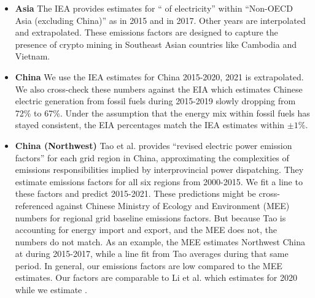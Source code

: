 \begin{appendices}
\begin{itemize}

    \item \textbf{Asia} The IEA\cite[65]{iea_co2_2019} provides estimates for ``\ef{} of electricity'' within ``Non-OECD Asia (excluding China)'' as  in 2015 and  in 2017. Other years are interpolated and extrapolated. These emissions factors are designed to capture the presence of crypto mining in Southeast Asian countries like Cambodia and Vietnam\cite{redman_chinese_2018}.
    
    \item \textbf{China} We use the IEA\cite{iea_development_2020} estimates for China 2015-2020, 2021 is extrapolated. We also cross-check these numbers against the EIA\cite{us_eia_international_2021} which estimates Chinese electric generation from fossil fuels during 2015-2019 slowly dropping from 72\% to 67\%. Under the assumption that the energy mix within fossil fuels has stayed consistent, the EIA percentages match the IEA estimates within $\pm1\%$.
    
    \item \textbf{China (Northwest)} Tao et al.\cite{tao_measuring_2016} provides ``revised electric power emission factors'' for each grid region in China, approximating the complexities of emissions responsibilities implied by interprovincial power dispatching. They estimate emissions factors for all six regions from 2000-2015. We fit a line to these factors and predict 2015-2021. These predictions might be cross-referenced against Chinese Ministry of Ecology and Environment (MEE) numbers for regional grid baseline emissions factors\cite{yu_baseline_2020}. But because Tao is accounting for energy import and export, and the MEE does not, the numbers do not match. As an example, the MEE estimates Northwest China at  during 2015-2017, while a line fit from Tao averages  during that same period. In general, our emissions factors are low compared to the MEE estimates. Our factors are comparable to Li et al.\cite{li_life_2018} which estimates  for 2020 while we estimate .
    

\end{itemize}
\end{appendices}

